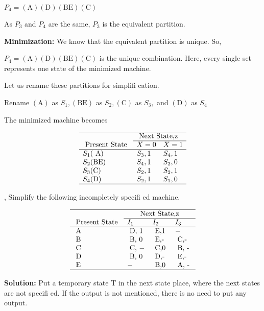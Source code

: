 \documentclass [7pt]{beamer}
\begin{document}
\begin{frame}
\justifying	
$P_{4}=(\mathrm{A})(\mathrm{D})(\mathrm{BE})(\mathrm{C})$

As $P_{3}$ and $P_{4}$ are the same, $P_{3}$ is the equivalent partition.


\textbf{Minimization:} We know that the cquivalent partition is unique. So,


$P_{4}=(\mathrm{A})(\mathrm{D})(\mathrm{BE})(\mathrm{C})$ is the unique combination. Here, every single set represents one state of the minimized machine.


Let us rename these partitions for simplifi cation. 


Rename $(\mathrm{A})$ as $S_{1},(\mathrm{BE})$ as $S_{2},(\mathrm{C})$ as $S_{3},$ and $(\mathrm{D})$ as $S_{4}$ 


The minimized machine becomes


$$
\begin{array}{lll}
\hline & \multicolumn{2}{l} {\text { Next State,z }} \\
\cline { 2 - 3 } \text { Present State } & X=0 & X= 1 \\
\hline S_{1}(\mathrm{~A}) & S_{3}, 1 & S_{4}, 1 \\
S_{2}(\mathrm{BE}) & S_{4}, 1 & S_{2}, 0 \\
S_{3}(\mathrm{C}) & S_{2}, 1 & S_{2}, 1 \\
S_{4}(\mathrm{D}) & S_{2}, 1 & S_{1}, 0 \\
\hline
\end{array}
$$

\end{frame}

\begin{frame}
, Simplify the following incompletely specifi ed machine. 


$$\begin{array}{llll}
\hline & \multicolumn{3}{c} {\text { Next State,z }} \\
\cline { 2 - 4 } \text { Present State } & I_{1} & I_{2} & I_{3} \\
\hline \text { A } & \text { D, 1 } & \text { E,1 } & - \\
\text { B } & \text { B, 0 } & \text { E,- } & \text { C,- } \\
\text { C } & \text { C, }- & \text { C,0 } & \text { B, - } \\
\text { D } & \text { B, 0 } & \text { D,- } & \text { E,- } \\
\text { E } & - & \text { B,0 } & \text { A, - } \\
\hline
\end{array}$$

\textbf{Solution:} Put a temporary state T in the next state place, where the next states are not specifi ed. If the output is not mentioned, there is no need to put any output. 
	
\end{frame}
\end{document}
